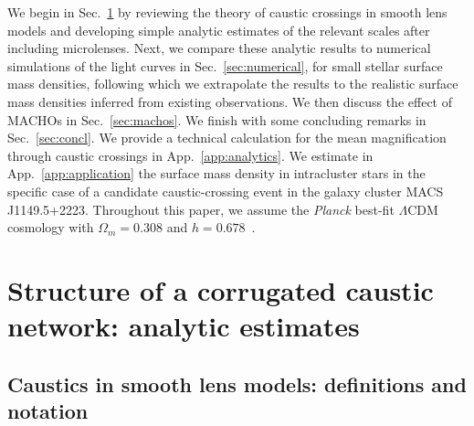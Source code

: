 \documentclass{aastex6}
\newcommand{\refsec}[1]{Sec.~\ref{sec:#1}}
\newcommand{\refapp}[1]{App.~\ref{app:#1}}
\begin{document}
We begin in \refsec{analyt} by reviewing the theory of caustic crossings in smooth lens models and developing simple analytic 
estimates of the relevant scales after including microlenses. Next, we compare these 
analytic results to numerical simulations of the light curves in \refsec{numerical}, for small stellar surface mass densities, following which we extrapolate the results to the realistic surface mass densities inferred 
from existing observations. We then discuss the effect of MACHOs in \refsec{machos}. We finish 
with some concluding remarks in \refsec{concl}. We provide a technical calculation for the mean magnification through caustic crossings in \refapp{analytics}. We estimate in \refapp{application} the surface mass density in intracluster 
stars in the specific case of a candidate caustic-crossing event in the galaxy cluster MACS\,J1149.5+2223. 
Throughout this paper, we assume the {\em Planck} best-fit $\Lambda$CDM cosmology with $\Omega_m=0.308$ and
$h=0.678$~\citep{Ade:2015xua}.

\section{Structure of a corrugated caustic network: analytic estimates}
\label{sec:analyt}


\subsection{Caustics in smooth lens models: definitions and notation}
\label{sec:macrolens}

\end{document}
